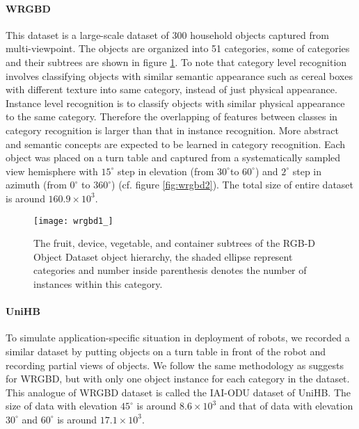 \paragraph{WRGBD\cite{lai2011large}} This dataset is a large-scale dataset of 300 household objects captured from multi-viewpoint. The objects are organized into 51 categories, some of categories and their subtrees are shown in figure \ref{fig:wrgbd1}. To note that category level recognition involves classifying objects with similar semantic appearance such as cereal boxes with different texture into same category, instead of just physical appearance. Instance level recognition is to classify objects with similar physical appearance to the same category. Therefore the overlapping of features between classes in category recognition is larger than that in instance recognition. More abstract and semantic concepts are expected to be learned in category recognition. Each object was placed on a turn table and captured from a systematically sampled view hemisphere with $15^{\circ}$ step in elevation (from $30^{\circ}$to $60^{\circ}$) and $2^\circ$ step in azimuth (from $0^\circ$ to $360^\circ$) (cf. figure \ref{fig:wrgbd2}). The total size of entire dataset is around $160.9\times10^3$. 

\begin{figure}[h!]
	\begin{center}
		\texttt{[image: wrgbd1\_]}
		\caption{The fruit, device, vegetable, and container subtrees of the RGB-D Object Dataset object hierarchy, the shaded ellipse represent categories and number inside parenthesis denotes the number of instances within this category\cite{lai2011large}.}		
		\label{fig:wrgbd1}
	\end{center} 
\end{figure}
\paragraph{UniHB} To simulate application-specific situation in deployment of robots, we recorded a similar dataset by putting objects on a turn table in front of the robot and recording partial views of objects. We follow the same methodology as \cite{lai2011large} suggests for WRGBD, but with only one object instance for each category in the dataset. This analogue of WRGBD dataset is called the IAI-ODU dataset of UniHB. The size of data with elevation $45^\circ$ is around $8.6\times10^3$ and that of data with elevation $30^\circ$ and $60^\circ$ is around $17.1\times10^3$.

